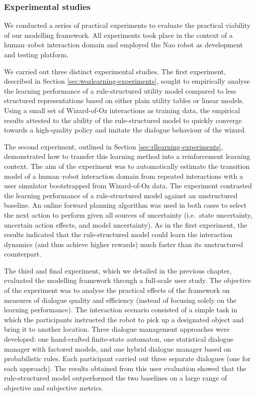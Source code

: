 \subsubsection*{Experimental studies}

We conducted a series of practical experiments to evaluate the practical viability of our modelling framework. All experiments took place in the context of a human--robot interaction domain and employed the Nao robot as development and testing platform. 

We carried out three distinct experimental studies.  The first experiment, described in Section \ref{sec:wozlearning-experiments}, sought to empirically analyse the learning performance of a rule-structured utility model compared to less structured representations based on either plain utility tables or linear models.  Using a small set of Wizard-of-Oz interactions as training data, the empirical results attested to the ability of the rule-structured model to quickly converge towards a high-quality policy and imitate the dialogue behaviour of the wizard.

The second experiment, outlined in Section \ref{sec:rllearning-experiments}, demonstrated how to transfer this learning method into a reinforcement learning context.  The aim of the experiment was to automatically estimate the transition model of a human--robot interaction domain from repeated interactions with a user simulator bootstrapped from Wizard-of-Oz data. The experiment contrasted the learning performance of a rule-structured model against an unstructured baseline.  An online forward planning algorithm was used in both cases to select the next action to perform given all sources of uncertainty (i.e.\ state uncertainty, uncertain action effects, and model uncertainty). As in the first experiment, the results indicated that the rule-structured model could learn the interaction dynamics (and thus achieve higher rewards) much faster than its unstructured counterpart.

The third and final experiment, which we detailed in the previous chapter, evaluated the modelling framework through a full-scale user study.   The objective of the experiment was to analyse the practical effects of the framework on measures of dialogue quality and efficiency (instead of focusing solely on the learning performance). The interaction scenario consisted of a simple task in which the participants instructed the robot to pick up a designated object and bring it to another location. Three dialogue management approaches were developed: one hand-crafted finite-state automaton, one statistical dialogue manager with factored models, and one hybrid dialogue manager based on probabilistic rules.  Each participant carried out three separate dialogues (one for each approach).  The results obtained from this user evaluation showed that the rule-structured model outperformed the two baselines on a large range of objective and subjective metrics.

